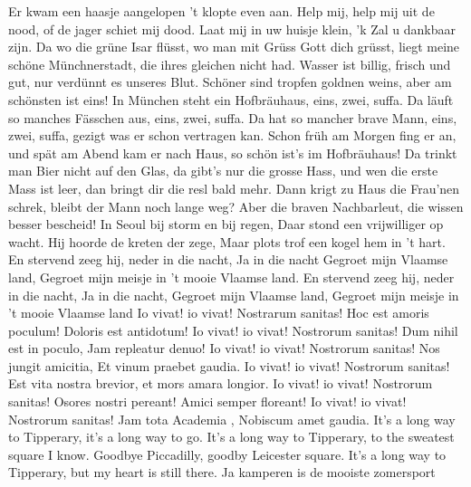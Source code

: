\documentclass{article}
\begin{document}
\begin{songs}{}
Er kwam een haasje aangelopen
't klopte even aan.
Help mij, help mij uit de nood,
of de jager schiet mij dood.
Laat mij in uw huisje klein,
'k Zal u dankbaar zijn. 
\endverse
\endsong
{}
\beginverse*
Da wo die grüne Isar flüsst,
wo man mit Grüss Gott dich grüsst,
liegt meine schöne Münchnerstadt,
die ihres gleichen nicht had.
Wasser ist billig, frisch und gut,
nur verdünnt es unseres Blut.
Schöner sind tropfen goldnen weins,
aber am schönsten ist eins!
In München steht ein Hofbräuhaus,
eins, zwei, suffa.
Da läuft so manches Fässchen aus,
eins, zwei, suffa.
Da hat so mancher brave Mann,
eins, zwei, suffa,
gezigt was er schon vertragen kan.
Schon früh am Morgen fing er an,
und spät am Abend kam er nach Haus,
so schön ist’s im Hofbräuhaus!
Da trinkt man Bier nicht auf den Glas,
da gibt’s nur die grosse Hass,
und wen die erste Mass ist leer,
dan bringt dir die resl bald mehr.
Dann krigt zu Haus die Frau’nen schrek,
bleibt der Mann noch lange weg?
Aber die braven Nachbarleut,
die wissen besser bescheid!
\endverse
\endsong
{}
\beginverse*
In Seoul bij storm en bij regen,
Daar stond een vrijwilliger op wacht.
Hij hoorde de kreten der zege,
Maar plots trof een kogel hem in ’t hart.
En stervend zeeg hij, neder in die nacht,
Ja in die nacht
\endverse
\beginverse*
Gegroet mijn Vlaamse land,
Gegroet mijn meisje in ’t mooie Vlaamse land.
En stervend zeeg hij, neder in die nacht,
Ja in die nacht,
\endverse
\beginverse*
Gegroet mijn Vlaamse land,
Gegroet mijn meisje in ’t mooie Vlaamse land
\endverse
\endsong
{}
\beginverse
Io vivat! io vivat!
Nostrarum sanitas!
Hoc est amoris poculum!
Doloris est antidotum!
\endverse
\beginverse
Io vivat! io vivat!
Nostrorum sanitas!
Dum nihil est in poculo,
Jam repleatur denuo!
\endverse
\beginverse
Io vivat! io vivat!
Nostrorum sanitas!
Nos jungit amicitia,
Et vinum praebet gaudia.
\endverse
\beginverse
Io vivat! io vivat!
Nostrorum sanitas!
Est vita nostra brevior,
et mors amara longior.
\endverse
\beginverse
Io vivat! io vivat!
Nostrorum sanitas!
Osores nostri pereant!
Amici semper floreant!
\endverse
\beginverse
Io vivat! io vivat!
Nostrorum sanitas!
Jam tota Academia ,
Nobiscum amet gaudia.
\endverse
\endsong
{}
\beginverse*
It’s a long way to Tipperary,
it’s a long way to go.
It’s a long way to Tipperary,
to the sweatest square I know.
Goodbye Piccadilly,
goodby Leicester square.
It’s a long way to Tipperary,
but my heart is still there.
\endverse
\endsong
{}
\beginverse
Ja kamperen is de mooiste zomersport

\end{songs}
\end{document}
